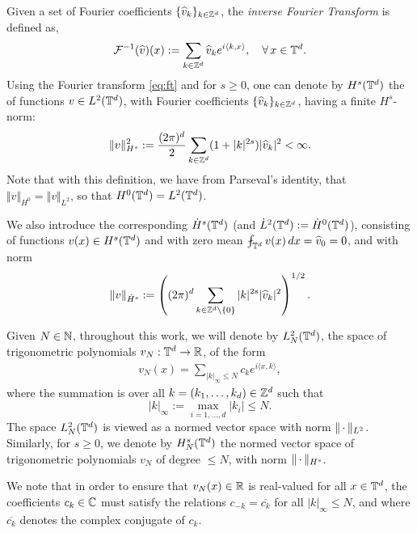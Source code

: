 \documentclass[reqno,a4paper]{amsart}
\begin{document}
Given a set of Fourier coefficients $\{\widehat{v}_k\}_{k \in \mathbb{Z}^d}$, the \emph{inverse Fourier Transform} is defined as, 
\begin{equation}
    \label{eq:ift}
    \mathcal{F}^{-1}(\widehat{v})(x)
:=
\sum_{k\in \mathbb{Z}^d} \widehat{v}_k e^{i \langle k, x\rangle},
\quad
\forall \, x\in \mathbb{T}^d.
\end{equation}
Using the Fourier transform \eqref{eq:ft} and for $s \ge 0$, one can denote by $H^s(\mathbb{T}^d)$ the  of functions $v\in L^2(\mathbb{T}^d)$, with Fourier coefficients $\{\widehat{v}_{k}\}_{k\in \mathbb{Z}^d}$,  having a finite $H^s$-norm:
\begin{align} \label{eq:Hs}
\Vert
v
\Vert_{H^s}^2
:=
\frac{(2\pi)^{d}}{2} \sum_{k\in \mathbb{Z}^d} (1+|k|^{2s}) |\widehat{v}_k|^2 < \infty.
\end{align}
Note that with this definition, we have from Parseval's identity, that $\Vert v \Vert_{H^0} = \Vert v \Vert_{L^2}$, so that $H^0(\mathbb{T}^d) = L^2(\mathbb{T}^d)$.

 We also introduce the corresponding  $\dot{H}^s(\mathbb{T}^d)$ (and $\dot{L}^2(\mathbb{T}^d) := \dot{H}^0(\mathbb{T}^d)$), consisting of functions $v(x)\in H^s(\mathbb{T}^d)$ and with zero mean $\fint_{\T^d} v(x) \, dx = \hat{v}_0 = 0$, and with norm
\begin{align} \label{eq:dotHs}
\Vert 
v
\Vert_{\dot{H}^s}
:=
\left(
(2\pi)^{d}
\sum_{k\in \mathbb{Z}^d\setminus \{0\}}
|k|^{2s} |\widehat{v}_k|^2
\right)^{1/2}.
\end{align}

Given $N\in \mathbb{N}$, throughout this work, we will denote by $L^2_N(\mathbb{T}^d)$, the space of trigonometric polynomials $v_N: \mathbb{T}^d \to \mathbb{R}$, of the form
\begin{align} \label{eq:pN}
v_N(x)
=
\sum_{|k|_\infty\le N} c_k e^{i\langle x, k\rangle},
\end{align}
where the summation is over all $k=(k_1,\dots, k_d)\in \mathbb{Z}^d$ such that 
\[
|k|_{\infty}:= \max_{i=1,\dots, d} |k_i| \le N.
\]
The space $L^2_N(\mathbb{T}^d)$ is viewed as a normed vector space with norm $\Vert {\,\cdot\,} \Vert_{L^2}$. Similarly, for $s\ge 0$, we denote by $H^s_N(\mathbb{T}^d)$ the normed vector space of trigonometric polynomials $v_N$ of degree $\le N$, with norm $\Vert {\,\cdot\,} \Vert_{H^s}$.

We note that in order to ensure that $v_N(x) \in \mathbb{R}$ is real-valued for all $x\in \mathbb{T}^d$, the coefficients $c_k\in \mathbb{C}$ must satisfy the relations $c_{-k} = \overline{c_k}$ for all $|k|_\infty \le N$, and where $\overline{c_k}$ denotes the complex conjugate of $c_k$.
\end{document}
